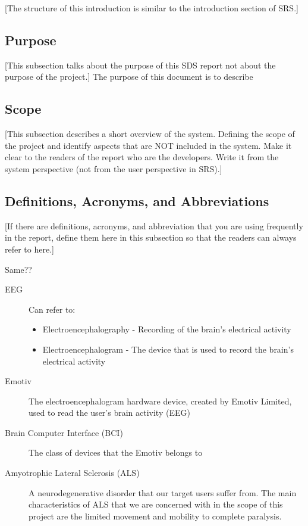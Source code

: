 \documentclass{article}
\begin{document}
[The structure of this introduction is similar to the introduction section of SRS.]

\subsection{Purpose}

[This subsection talks about the purpose of this SDS report not about the purpose of the project.]
The purpose of this document is to describe

\subsection{Scope}

[This subsection describes a short overview of the system.  Defining the scope of the project and identify aspects that are NOT included in the system.  Make it clear to the readers of the report who are the developers.  Write it from the system perspective (not from the user perspective in SRS).]

\subsection{Definitions, Acronyms, and Abbreviations}

[If there are definitions, acronyms, and abbreviation that you are using frequently in the report, define them here in this subsection so that the readers can always refer to here.]

Same??

\begin{description}
    \item[EEG] Can refer to:
        \begin{itemize}
            \item Electroencephalography - Recording of the brain's electrical
                activity 
	        \item Electroencephalogram - The device that is used to record the
	            brain's electrical activity
        \end{itemize}
    \item[Emotiv] The electroencephalogram hardware device, created by Emotiv
        Limited, used to read the user's brain activity (EEG)
    \item[Brain Computer Interface (BCI)] The class of devices that the Emotiv
        belongs to
    \item[Amyotrophic Lateral Sclerosis (ALS)] A neurodegenerative disorder
        that our target users suffer from. The main characteristics of ALS
        that we are concerned with in the scope of this project are the
        limited movement and mobility to complete paralysis.
\end{description}
\end{document}
